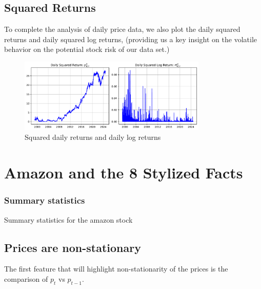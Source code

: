 \documentclass{article}
\begin{document}
\subsection{Squared Returns}

To complete the analysis of daily price data, we also plot the daily squared returns and daily squared log returns, 
(providing us a key insight on the volatile behavior on the potential stock risk of our data set.)
\begin{figure}[H]
    \centering
    \includegraphics[width=0.8\textwidth]{Img/squared_log_returns.pdf}
    \caption{Squared daily returns and daily log returns}
    \label{fig:squared_logreturns}
\end{figure}

\clearpage
\setcounter{page}{1}

\section{Amazon and the 8 Stylized Facts}

\subsubsection{Summary statistics}


\begin{table}[H]
    \centering
      
    \caption{Summary statistics for the amazon stock}
    \label{tab:Stylized_facts_preview}
\end{table}



\subsection{Prices are non-stationary}

The first feature that will highlight non-stationarity of
the prices is the comparison of \( p_t \) vs \( p_{t-1} \).
\end{document}
